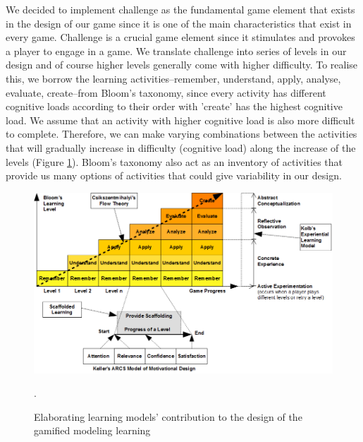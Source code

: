 \documentclass[12pt, a4paper]{report}
\begin{document}
We decided to implement challenge as the fundamental game element that exists in the design of our game since it is one of the main characteristics that exist in every game. Challenge is a crucial game element since it stimulates and provokes a player to engage in a game. We translate challenge into series of levels in our design and of course higher levels generally come with higher difficulty. To realise this, we borrow the learning activities--remember, understand, apply, analyse, evaluate, create--from Bloom's taxonomy, since every activity has different cognitive loads according to their order with 'create' has the highest cognitive load. We assume that an activity with higher cognitive load is also more difficult to complete. Therefore, we can make varying combinations between the activities that will gradually increase in difficulty (cognitive load) along the increase of the levels (Figure \ref{learning-models}). Bloom's taxonomy also act as an inventory of activities that provide us many options of activities that could give variability in our design. 

\begin{figure}[ht]
\centering
\includegraphics[width=\textwidth]{learning-models}
\caption{Elaborating learning models' contribution to the design of the gamified modeling learning}.
\label{learning-models}
\end{figure}
\end{document}
